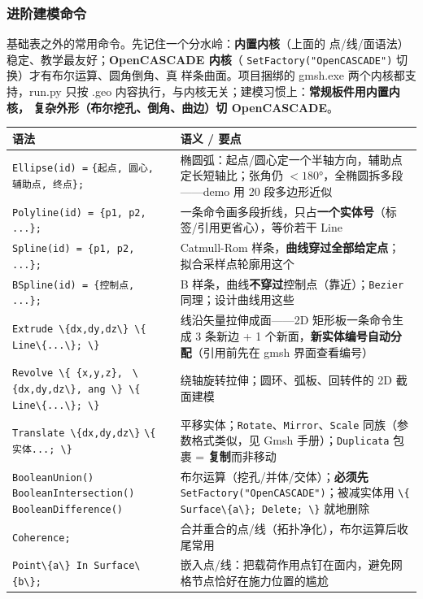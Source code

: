 \documentclass[12pt,a4paper]{ctexart}
\newcommand{\fem}{\Verb}
\begin{document}
\subsubsection{进阶建模命令}

基础表之外的常用命令。先记住一个分水岭：\textbf{内置内核}（上面的
点/线/面语法）稳定、教学最友好；\textbf{OpenCASCADE 内核}（
\fem|SetFactory("OpenCASCADE")| 切换）才有布尔运算、圆角倒角、真
样条曲面。项目捆绑的 gmsh.exe 两个内核都支持，run.py 只按 .geo
内容执行，与内核无关；建模习惯上：\textbf{常规板件用内置内核，
复杂外形（布尔挖孔、倒角、曲边）切 OpenCASCADE}。

\begin{longtable}{p{8.4cm}p{6.1cm}}
\toprule
\textbf{语法} & \textbf{语义 / 要点} \\
\midrule
\fem|Ellipse(id) =| \newline \fem|{起点, 圆心, 辅助点, 终点};| & 椭圆弧：起点/圆心定一个半轴方向，辅助点定长短轴比；张角仍 $<180°$，全椭圆拆多段——demo 用 20 段多边形近似 \\
\fem|Polyline(id) = {p1, p2, ...};| & 一条命令画多段折线，只占\textbf{一个实体号}（标签/引用更省心），等价若干 Line \\
\fem|Spline(id) = {p1, p2, ...};| & Catmull-Rom 样条，\textbf{曲线穿过全部给定点}；拟合采样点轮廓用这个 \\
\fem|BSpline(id) = {控制点, ...};| & B 样条，曲线\textbf{不穿过}控制点（靠近）；\fem|Bezier| 同理；设计曲线用这些 \\
\fem|Extrude \{dx,dy,dz\} \{ Line\{...\}; \}| & 线沿矢量拉伸成面——2D 矩形板一条命令生成 3 条新边 + 1 个新面，\textbf{新实体编号自动分配}（引用前先在 gmsh 界面查看编号） \\
\fem|Revolve \{ {x,y,z}, | \newline \fem|\{dx,dy,dz\}, ang \} \{ Line\{...\}; \}| & 绕轴旋转拉伸；圆环、弧板、回转件的 2D 截面建模 \\
\fem|Translate \{dx,dy,dz\}| \newline \fem|\{ 实体...; \}| & 平移实体；\fem|Rotate|、\fem|Mirror|、\fem|Scale| 同族（参数格式类似，见 Gmsh 手册）；\fem|Duplicata| 包裹 = \textbf{复制}而非移动 \\
\fem|BooleanUnion()| \newline \fem|BooleanIntersection()| \newline \fem|BooleanDifference()| & 布尔运算（挖孔/并体/交体）；\textbf{必须先} \fem|SetFactory("OpenCASCADE")|；被减实体用 \fem|\{ Surface\{a\}; Delete; \}| 就地删除 \\
\fem|Coherence;| & 合并重合的点/线（拓扑净化），布尔运算后收尾常用 \\
\fem|Point\{a\} In Surface\{b\};| & 嵌入点/线：把载荷作用点钉在面内，避免网格节点恰好在施力位置的尴尬 \\
\bottomrule
\end{longtable}
\normalsize
\end{document}
